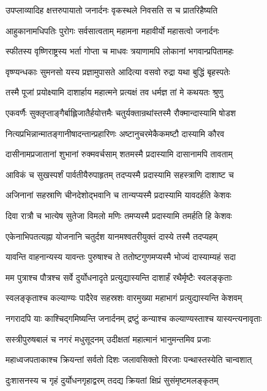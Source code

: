 \twolineshloka
{उपप्लाव्यादिह क्षत्तरुपायातो जनार्दनः}
{वृकस्थले निवसति स च प्रातरिहैष्यति}


\twolineshloka
{आहुकानामधिपतिः पुरोगः सर्वसात्वताम्}
{महामना महावीर्यो महासत्वो जनार्दनः}


\twolineshloka
{स्फीतस्य वृष्णिराष्ट्रस्य भर्ता गोप्ता च माधवः}
{त्रयाणामपि लोकानां भगवान्प्रपितामहः}


\twolineshloka
{वृष्ण्यन्धकाः सुमनसो यस्य प्रज्ञामुपासते}
{आदित्या वसवो रुद्रा यथा बुद्धिं बृहस्पतेः}


\twolineshloka
{तस्मै पूजां प्रयोक्ष्यामि दाशार्हाय महात्मने}
{प्रत्यक्षं तव धर्मज्ञ तां मे कथयतः श्रुणु}


\twolineshloka
{एकवर्णैः सुक्लृप्ताङ्गैर्बाह्लिजातैर्हयोत्तमैः}
{चतुर्यक्तान्रथांस्तस्मै रौक्मान्दास्यामि षोडश}


\twolineshloka
{नित्यप्रभिन्नान्मातङ्गानीषादन्तान्प्रहारिणः}
{अष्टानुचरमेकैकमष्टौ दास्यामि कौरव}


\twolineshloka
{दासीनामप्रजातानां शुभानां रुक्मवर्चसाम्}
{शतमस्मै प्रदास्यामि दासानामपि तावताम्}


\twolineshloka
{आविकं च सुखस्पर्शं पार्वतीयैरुपाहृतम्}
{तदप्यस्मै प्रदास्यामि सहस्त्राणि दाशाष्ट च}


\twolineshloka
{अजिनानां सहस्राणि चीनदेशोद्भवानि च}
{तान्यप्यस्मै प्रदास्यामि यावदर्हति केशवः}


\twolineshloka
{दिवा रात्रौ च भात्येष सुतेजा विमलो मणिः}
{तमप्यस्मै प्रदास्यामि तमर्हति हि केशवः}


\twolineshloka
{एकेनाभिपतत्यह्ना योजनानि चतुर्दश}
{यानमश्वतरीयुक्तं दास्ये तस्मै तदप्यहम्}


\twolineshloka
{यावन्ति वाहनान्यस्य यावन्तः पुरुषाश्च ते}
{ततोष्टगुणमप्यस्मै भोज्यं दास्याम्यहं सदा}


\twolineshloka
{मम पुत्राश्च पौत्रश्च सर्वे दुर्योधनादृते}
{प्रत्युद्यास्यन्ति दाशार्हं रथैर्मृष्टैः स्वलङ्कृताः}


\twolineshloka
{स्वलङ्कृताश्च कल्याण्यः पादैरेव सहस्रशः}
{वारमुख्या महाभागं प्रत्युद्यास्यन्ति केशवम्}


\twolineshloka
{नगरादपि याः काश्चिद्गमिष्यन्ति जनार्दनम्}
{द्रष्टुं कन्याश्च कल्याण्यस्ताश्च यास्यन्त्यनावृताः}


\twolineshloka
{सस्त्रीपुरुषबालं च नगरं मधुसूदनम्}
{उदीक्षतां महात्मानं भानुमन्तमिव प्रजाः}


\twolineshloka
{महाध्वजपताकाश्च क्रियन्तां सर्वतो दिशः}
{जलावसिक्तो विरजाः पन्थास्तस्येति चान्वशात्}


\twolineshloka
{दुःशासनस्य च गृहं दुर्योधनगृहाद्वरम्}
{तदद्य क्रियतां क्षिप्रं सुसंमृष्टमलङ्कृतम्}



